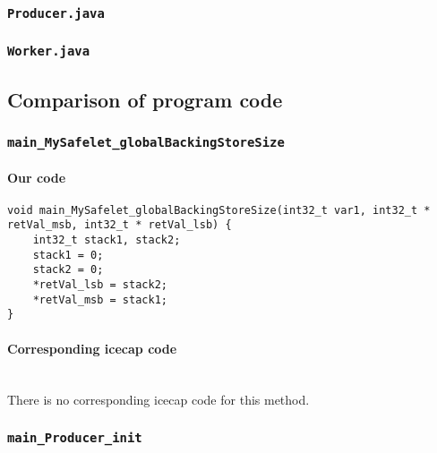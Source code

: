 \begin{landscape}
\begin{multicols}{2}
\subsubsection{\texttt{Producer.java}}


\subsubsection{\texttt{Worker.java}}


\subsection{Comparison of program code}
\label{PersistentSignal-code-comparison-subsection}

\subsubsection{\texttt{main\_MySafelet\_globalBackingStoreSize}}

\paragraph{Our code}\hfill
\begin{lstlisting}[firstnumber=257]
void main_MySafelet_globalBackingStoreSize(int32_t var1, int32_t * retVal_msb, int32_t * retVal_lsb) {
	int32_t stack1, stack2;
	stack1 = 0;
	stack2 = 0;
	*retVal_lsb = stack2;
	*retVal_msb = stack1;
}
\end{lstlisting}

\paragraph{Corresponding icecap code}\hfill\\
There is no corresponding icecap code for this method.

\subsubsection{\texttt{main\_Producer\_init}}


\end{multicols}
\end{landscape}

